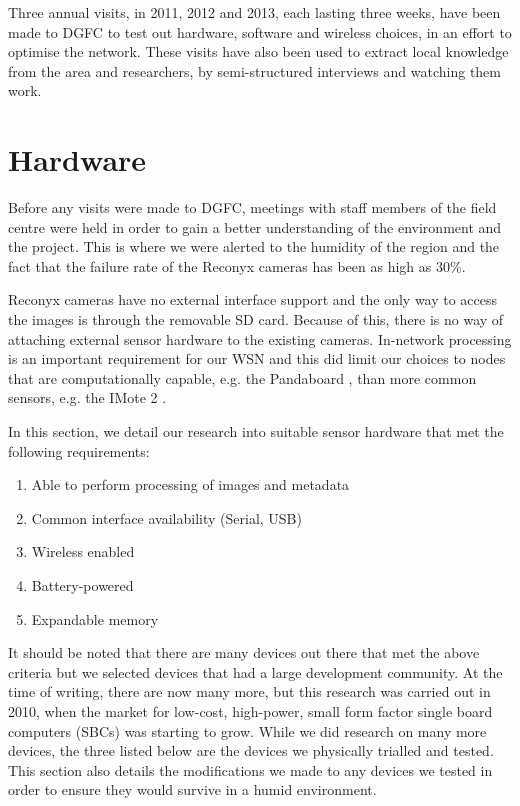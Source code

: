 Three annual visits, in 2011, 2012 and 2013, each lasting three weeks, have been made to DGFC to test out hardware, software and wireless choices, in an effort to optimise the network. These visits have also been used to extract local knowledge from the area and researchers, by semi-structured interviews and watching them work.

\section{Hardware}\label{tech:hw}
	Before any visits were made to DGFC, meetings with staff members of the field centre were held in order to gain a better understanding of the environment and the project. This is where we were alerted to the humidity of the region and the fact that the failure rate of the Reconyx cameras has been as high as 30\%.

Reconyx cameras have no external interface support and the only way to access the images is through the removable SD card. Because of this, there is no way of attaching external sensor hardware to the existing cameras. In-network processing is an important requirement for our WSN and this did limit our choices to nodes that are computationally capable, e.g. the Pandaboard \cite{instruments2012pandaboard}, than more common sensors, e.g. the IMote 2 \cite{Nachman2008}.

In this section, we detail our research into suitable sensor hardware that met the following requirements:
\begin{enumerate}
	\item Able to perform processing of images and metadata
	\item Common interface availability (Serial, USB)
	\item Wireless enabled
	\item Battery-powered
	\item Expandable memory
\end{enumerate}
It should be noted that there are many devices out there that met the above criteria but we selected devices that had a large development community. At the time of writing, there are now many more, but this research was carried out in 2010, when the market for low-cost, high-power, small form factor single board computers (SBCs) was starting to grow. While we did research on many more devices, the three listed below are the devices we physically trialled and tested.
This section also details the modifications we made to any devices we tested in order to ensure they would survive in a humid environment.

